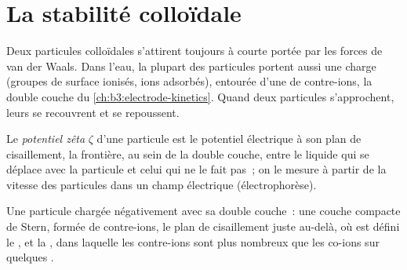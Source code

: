 \section{La stabilité colloïdale}

Deux particules colloïdales s'attirent toujours à courte portée par les
forces de van der Waals. Dans l'eau, la plupart des particules portent
aussi une charge (groupes de surface ionisés, ions adsorbés), entourée
d'une  de contre-ions, la double couche du
\cref{ch:b3:electrode-kinetics}. Quand deux particules s'approchent,
leurs  se recouvrent et se repoussent.

\begin{definition}\label{def:b3:colloids:zeta}
Le \emph{potentiel zêta} $\zeta$ d'une particule est le
potentiel électrique à son plan de cisaillement, la frontière, au sein
de la double couche, entre le liquide qui se déplace avec la particule
et celui qui ne le fait pas~; on le mesure à partir de la vitesse des
particules dans un champ électrique
(électrophorèse).
\end{definition}

\begin{omfigure}

{\small Une particule chargée négativement avec sa double couche~: une
couche compacte de Stern, formée de contre-ions, le plan de cisaillement
juste au-delà, où est défini le , et la ,
dans laquelle les contre-ions sont plus nombreux que les co-ions sur
quelques .}
\end{omfigure}

